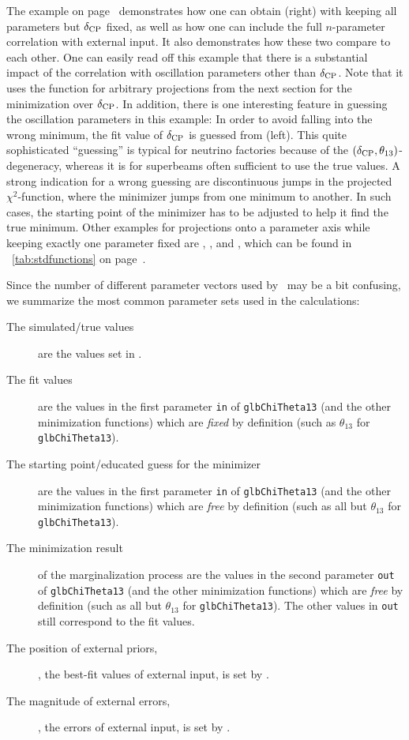 The example on page~\pageref{ex:corrproj} demonstrates how one can obtain  (right) with keeping all parameters but $\delta_{\mathrm{CP}}$ fixed, as well as how one can include the full $n$-parameter correlation with external input. It also demonstrates how these two compare to each other. One can easily read off this example that 
there is a substantial impact of the
correlation with oscillation parameters other than $\delta_{\mathrm{CP}}$. 
Note that it uses the function
 for arbitrary projections from the next section for the minimization over $\delta_{\mathrm{CP}}$.
In addition, there is one interesting feature in guessing the
oscillation parameters in this example: In order to avoid falling
into the wrong minimum, the fit value of $\delta_{\mathrm{CP}}$ is guessed from  (left). This quite sophisticated ``guessing'' is typical
for neutrino factories because of the $(\delta_{\mathrm{CP}}, \theta_{13})$-degeneracy, whereas it is for superbeams often sufficient
to use the true values. A strong indication for a wrong guessing 
are discontinuous jumps in the projected $\chi^2$-function, where the minimizer jumps from one minimum to another. In such cases, the starting point of the minimizer has to be adjusted to help it find the true minimum.
%
Other examples for projections onto a parameter axis while keeping exactly one parameter fixed are , , and , which
can be found in \Tab~\ref{tab:stdfunctions} on page~\pageref{tab:stdfunctions}.

Since the number of different parameter vectors used by \GLOBES\ may be a bit confusing, we summarize the most common parameter sets used in the calculations:
\begin{description}
\item[The simulated/true values] are the values set in .
\item[The fit values] are the values in the first parameter {\tt in} of {\tt glbChiTheta13} (and the other minimization functions) which are {\em fixed} by definition (such as $\theta_{13}$ for {\tt glbChiTheta13}). 
\item[The starting point/educated guess for the minimizer] are the values in the first parameter {\tt in} of {\tt glbChiTheta13} (and the other minimization functions) which are {\em free} by definition (such as all but $\theta_{13}$ for {\tt glbChiTheta13}). 
\item[The minimization result] of the marginalization process are the values in the second parameter {\tt out} of {\tt glbChiTheta13} (and the other minimization functions) which are {\em free} by definition (such as all but $\theta_{13}$ for {\tt glbChiTheta13}). The other values in {\tt out} still correspond to the fit values. 
\item[The position of external priors,] \ie, the best-fit values of external input, is set by .
\item[The magnitude of external errors,] \ie, the errors of external input, is set by .
\end{description}


